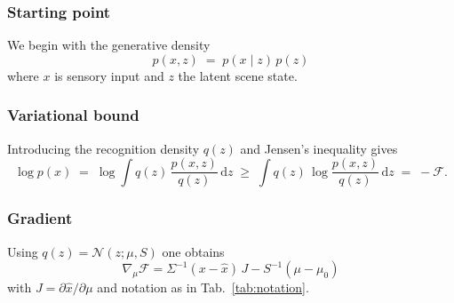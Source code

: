 \subsubsection*{Starting point}

We begin with the generative density
\[
p(x,z)\;=\;p(x\mid z)\,p(z)
\]
where $x$ is sensory input and $z$ the latent scene state.

\subsubsection*{Variational bound}

Introducing the recognition density $q(z)$ and Jensen’s inequality gives
\[
\log p(x)\;=\;\log\!\int q(z)\,\frac{p(x,z)}{q(z)}\,\mathrm dz
\;\ge\;
\int q(z)\,\log\frac{p(x,z)}{q(z)}\,\mathrm dz\;=\;-\mathcal F .
\]

\subsubsection*{Gradient}

Using $q(z)=\mathcal N(z;\mu,S)$ one obtains
\[
\nabla_{\mu}\mathcal F
=\Sigma^{-1}(x-\hat x)\,J
-\!S^{-1}\!(\mu-\mu_0)
\]
with $J=\partial\hat x/\partial\mu$ and notation as in
Tab.~\ref{tab:notation}.

